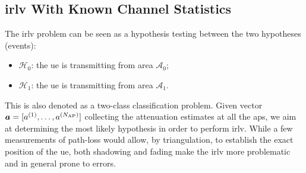\documentclass[draftcls,onecolumn,12pt]{IEEEtran}
\begin{document}
\subsection{\ac{irlv} With Known Channel Statistics}\label{sec:auth}

The \ac{irlv} problem can be seen as a hypothesis testing between the two hypotheses (events):
\begin{itemize}
    \item $\mathcal{H}_0$: the \ac{ue} is transmitting from area $\mathcal{A}_0$;
    \item $\mathcal{H}_1$: the \ac{ue} is transmitting from area $\mathcal{A}_1$.
\end{itemize}
This is also denoted as a two-class classification problem. Given vector $\bm{a} = [a^{(1)}, \ldots, a^{(N_{\rm AP})}]$ collecting the attenuation estimates at all the \acp{ap}, we aim  at determining the most likely hypothesis in order to perform \ac{irlv}. While a few measurements of path-loss would allow, by triangulation, to establish the exact position of the \ac{ue}, both shadowing and fading make the \ac{irlv} more problematic and in general prone to errors. 
\end{document}
